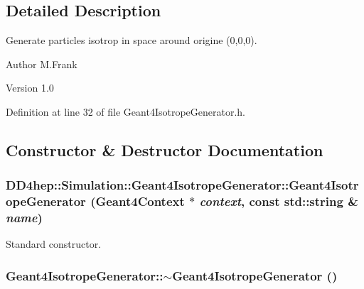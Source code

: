 \subsection{Detailed Description}
Generate particles isotrop in space around origine (0,0,0). \begin{DoxyAuthor}{Author}
M.Frank 
\end{DoxyAuthor}
\begin{DoxyVersion}{Version}
1.0 
\end{DoxyVersion}


Definition at line 32 of file Geant4IsotropeGenerator.h.

\subsection{Constructor \& Destructor Documentation}
\hypertarget{class_d_d4hep_1_1_simulation_1_1_geant4_isotrope_generator_a5db218a6abf4aa629528357a42bc530a}{
\subsubsection[{Geant4IsotropeGenerator}]{\setlength{\rightskip}{0pt plus 5cm}DD4hep::Simulation::Geant4IsotropeGenerator::Geant4IsotropeGenerator ({\bf Geant4Context} $\ast$ {\em context}, \/  const std::string \& {\em name})}}
\label{class_d_d4hep_1_1_simulation_1_1_geant4_isotrope_generator_a5db218a6abf4aa629528357a42bc530a}


Standard constructor. \hypertarget{class_d_d4hep_1_1_simulation_1_1_geant4_isotrope_generator_a0c8cc2163617f319fd3b58a11b3e64ea}{
\subsubsection[{$\sim$Geant4IsotropeGenerator}]{\setlength{\rightskip}{0pt plus 5cm}Geant4IsotropeGenerator::$\sim$Geant4IsotropeGenerator ()}}
\label{class_d_d4hep_1_1_simulation_1_1_geant4_isotrope_generator_a0c8cc2163617f319fd3b58a11b3e64ea}


